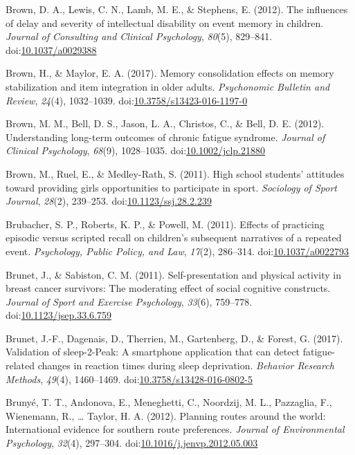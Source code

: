 \documentclass[english,man]{apa6}
\begin{document}
\hypertarget{ref-Brown2012}{}
Brown, D. A., Lewis, C. N., Lamb, M. E., \& Stephens, E. (2012). The
influences of delay and severity of intellectual disability on event
memory in children. \emph{Journal of Consulting and Clinical
Psychology}, \emph{80}(5), 829--841.
doi:\href{https://doi.org/10.1037/a0029388}{10.1037/a0029388}

\hypertarget{ref-Brown2016}{}
Brown, H., \& Maylor, E. A. (2017). Memory consolidation effects on
memory stabilization and item integration in older adults.
\emph{Psychonomic Bulletin and Review}, \emph{24}(4), 1032--1039.
doi:\href{https://doi.org/10.3758/s13423-016-1197-0}{10.3758/s13423-016-1197-0}

\hypertarget{ref-Brown2012a}{}
Brown, M. M., Bell, D. S., Jason, L. A., Christos, C., \& Bell, D. E.
(2012). Understanding long-term outcomes of chronic fatigue syndrome.
\emph{Journal of Clinical Psychology}, \emph{68}(9), 1028--1035.
doi:\href{https://doi.org/10.1002/jclp.21880}{10.1002/jclp.21880}

\hypertarget{ref-Brown2011}{}
Brown, M., Ruel, E., \& Medley-Rath, S. (2011). High school students'
attitudes toward providing girls opportunities to participate in sport.
\emph{Sociology of Sport Journal}, \emph{28}(2), 239--253.
doi:\href{https://doi.org/10.1123/ssj.28.2.239}{10.1123/ssj.28.2.239}

\hypertarget{ref-Brubacher2011}{}
Brubacher, S. P., Roberts, K. P., \& Powell, M. (2011). Effects of
practicing episodic versus scripted recall on children's subsequent
narratives of a repeated event. \emph{Psychology, Public Policy, and
Law}, \emph{17}(2), 286--314.
doi:\href{https://doi.org/10.1037/a0022793}{10.1037/a0022793}

\hypertarget{ref-Brunet2011}{}
Brunet, J., \& Sabiston, C. M. (2011). Self-presentation and physical
activity in breast cancer survivors: The moderating effect of social
cognitive constructs. \emph{Journal of Sport and Exercise Psychology},
\emph{33}(6), 759--778.
doi:\href{https://doi.org/10.1123/jsep.33.6.759}{10.1123/jsep.33.6.759}

\hypertarget{ref-Brunet2016}{}
Brunet, J.-F., Dagenais, D., Therrien, M., Gartenberg, D., \& Forest, G.
(2017). Validation of sleep-2-Peak: A smartphone application that can
detect fatigue-related changes in reaction times during sleep
deprivation. \emph{Behavior Research Methods}, \emph{49}(4), 1460--1469.
doi:\href{https://doi.org/10.3758/s13428-016-0802-5}{10.3758/s13428-016-0802-5}

\hypertarget{ref-Brunye2012}{}
Brunyé, T. T., Andonova, E., Meneghetti, C., Noordzij, M. L., Pazzaglia,
F., Wienemann, R., \ldots{} Taylor, H. A. (2012). Planning routes around
the world: International evidence for southern route preferences.
\emph{Journal of Environmental Psychology}, \emph{32}(4), 297--304.
doi:\href{https://doi.org/10.1016/j.jenvp.2012.05.003}{10.1016/j.jenvp.2012.05.003}
\end{document}
